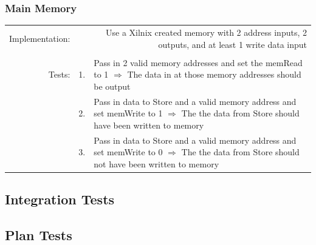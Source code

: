 \documentclass{article}
\begin{document}
		\subsubsection{Main Memory}
			\begin{tabular}{ r  r  p{12cm} }
				Implementation: & \multicolumn{2}{p{12.75cm}}{Use a Xilnix created memory with 2 address inputs, 2 outputs, and at least 1 write data input}\\
				                &    & \\
				         Tests: & 1. & Pass in 2 valid memory addresses and set the memRead to 1 $\Rightarrow$ The data in at those memory addresses should be output\\
				                & 2. & Pass in data to Store and a valid memory address and set memWrite to 1 $\Rightarrow$ The the data from Store should have been written to memory\\
				                & 3. & Pass in data to Store and a valid memory address and set memWrite to 0 $\Rightarrow$ The the data from Store should not have been written to memory\\
			\end{tabular}
	\subsection{Integration Tests}
	\subsection{Plan Tests}
\end{document}
